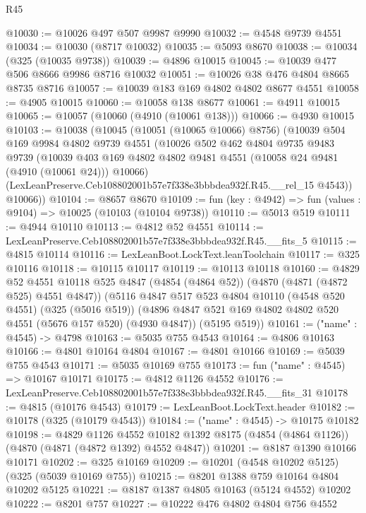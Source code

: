 \begin{lexlean}{R45}
\begin{coremodule}
@10030 := @10026 @497 @507 @9987 @9990
@10032 := @4548 @9739 @4551
@10034 := @10030 (@8717 @10032)
@10035 := @5093 @8670
@10038 := @10034 (@325 (@10035 @9738))
@10039 := @4896 @10015
@10045 := @10039 @477 @506 @8666 @9986 @8716 @10032
@10051 := @10026 @38 @476 @4804 @8665 @8735 @8716
@10057 := @10039 @183 @169 @4802 @4802 @8677 @4551
@10058 := @4905 @10015
@10060 := @10058 @138 @8677
@10061 := @4911 @10015
@10065 := @10057 (@10060 (@4910 (@10061 @138)))
@10066 := @4930 @10015
@10103 := @10038
    (@10045
      (@10051 (@10065 @10066) @8756)
      (@10039
        @504
        @169
        @9984
        @4802
        @9739
        @4551
        (@10026
          @502
          @462
          @4804
          @9735
          @9483
          @9739
          (@10039 @403 @169 @4802 @4802 @9481 @4551 (@10058 @24 @9481 (@4910 (@10061 @24))) @10066)
          (LexLeanPreserve.Ceb108802001b57e7f338e3bbbdea932f.R45.__rel_15 @4543))
        @10066))
@10104 := @8657 @8670
@10109 := fun (key : @4942) => fun (values : @9104) => @10025 (@10103 (@10104 @9738))
@10110 := @5013 @519
@10111 := @4944 @10110
@10113 := @4812 @52 @4551
@10114 := LexLeanPreserve.Ceb108802001b57e7f338e3bbbdea932f.R45.__fits_5
@10115 := @4815 @10114
@10116 := LexLeanBoot.LockText.leanToolchain
@10117 := @325 @10116
@10118 := @10115 @10117
@10119 := @10113 @10118
@10160 := @4829
    @52
    @4551
    @10118
    @525
    @4847
    (@4854 (@4864 @52))
    (@4870 (@4871 (@4872 @525) @4551 @4847))
    (@5116
      @4847
      @517
      @523
      @4804
      @10110
      (@4548 @520 @4551)
      (@325 (@5016 @519))
      (@4896 @4847 @521 @169 @4802 @4802 @520 @4551 (@5676 @157 @520) (@4930 @4847))
      (@5195 @519))
@10161 := ("name" : @4545) -> @4798
@10163 := @5035 @755 @4543
@10164 := @4806 @10163
@10166 := @4801 @10164 @4804
@10167 := @4801 @10166
@10169 := @5039 @755 @4543
@10171 := @5035 @10169 @755
@10173 := fun ("name" : @4545) => @10167 @10171
@10175 := @4812 @1126 @4552
@10176 := LexLeanPreserve.Ceb108802001b57e7f338e3bbbdea932f.R45.__fits_31
@10178 := @4815 (@10176 @4543)
@10179 := LexLeanBoot.LockText.header
@10182 := @10178 (@325 (@10179 @4543))
@10184 := ("name" : @4545) -> @10175 @10182
@10198 := @4829
    @1126
    @4552
    @10182
    @1392
    @8175
    (@4854 (@4864 @1126))
    (@4870 (@4871 (@4872 @1392) @4552 @4847))
@10201 := @8187 @1390 @10166 @10171
@10202 := @325 @10169
@10209 := @10201 (@4548 @10202 @5125) (@325 (@5039 @10169 @755))
@10215 := @8201 @1388 @759 @10164 @4804 @10202 @5125
@10221 := @8187 @1387 @4805 @10163 (@5124 @4552) @10202
@10222 := @8201 @757
@10227 := @10222 @476 @4802 @4804 @756 @4552

\end{coremodule}
\end{lexlean}

